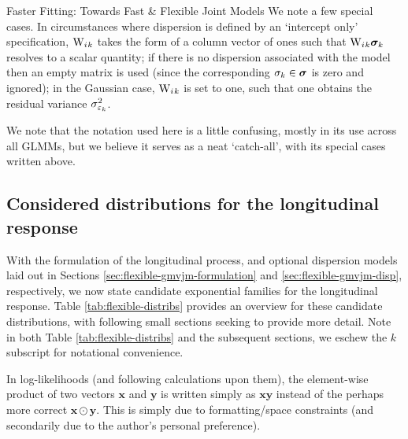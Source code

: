 \begin{chapter}{\label{cha:flexible}Faster Fitting: Towards Fast \& Flexible Joint Models}
We note a few special cases. In circumstances where dispersion is defined by an `intercept only' specification, $\mathrm{W}_i{_k}$ takes the form of a column vector of ones such that $\mathrm{W}_i{_k}\bm{\sigma}_k$ resolves to a scalar quantity; if there is no dispersion associated with the model then an empty matrix is used (since the corresponding  $\sigma_k\in\bm{\sigma}$ is zero and ignored); in the Gaussian case, $\mathrm{W}_i{_k}$ is set to one, such that one obtains the residual variance $\sigma_{\varepsilon_k}^2$.

We note that the notation used here is a little confusing, mostly in its use across all GLMMs, but we believe it serves as a neat `catch-all', with its special cases written above.

\subsection{Considered distributions for the longitudinal response}\label{sec:flexible-gmvjm-distribs}
\rmtoc
With the formulation of the longitudinal process, and optional dispersion models laid out in Sections \ref{sec:flexible-gmvjm-formulation} and \ref{sec:flexible-gmvjm-disp}, respectively, we now state candidate exponential families for the longitudinal response. Table \ref{tab:flexible-distribs} provides an overview for these candidate distributions, with following small sections seeking to provide more detail. Note in both Table \ref{tab:flexible-distribs} and the subsequent sections, we eschew the $k$ subscript for notational convenience.

\begin{remark}
    In log-likelihoods (and following calculations upon them), the element-wise product of two vectors $\bm{x}$ and $\bm{y}$ is written simply as $\bm{x}\bm{y}$ instead of the perhaps more correct $\bm{x}\odot\bm{y}$. This is simply due to formatting/space constraints (and secondarily due to the author's personal preference).
\end{remark}


\end{chapter}
